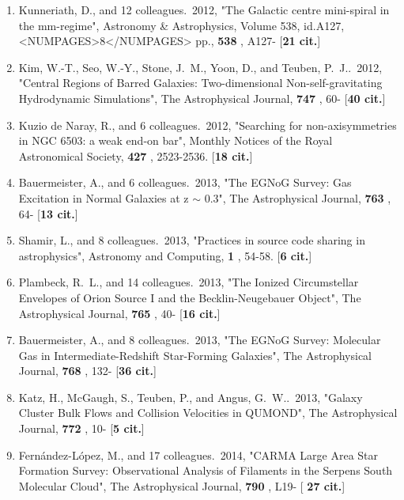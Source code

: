 \documentclass[11pt,letterpaper]{article}
\newcommand{\amp}{\&}
\newcommand{\ap}{$\sim$}
\begin{document}
\begin{enumerate}[resume,label=\textbf{\arabic*}.]
\item  
Kunneriath, D., and 12 colleagues.\  2012,  "The Galactic centre 
mini-spiral in the mm-regime", Astronomy {\amp} Astrophysics, Volume 538, 
id.A127, <NUMPAGES>8</NUMPAGES> pp.,  {\bf 538} , A127- [{\bf 21 cit.}] 

\item  
Kim, W.-T., Seo, W.-Y., Stone, J.~M., Yoon, D., and Teuben, P.~J..\  2012,  
"Central Regions of Barred Galaxies: Two-dimensional Non-self-gravitating 
Hydrodynamic Simulations", The Astrophysical Journal,  {\bf 747} , 60- 
[{\bf 40 cit.}] 

\item  
Kuzio de Naray, R., and 6 colleagues.\  2012,  "Searching for 
non-axisymmetries in NGC 6503: a weak end-on bar", Monthly Notices of the 
Royal Astronomical Society,  {\bf 427} , 2523-2536.  [{\bf 18 cit.}] 

\item  
Bauermeister, A., and 6 colleagues.\  2013,  "The EGNoG Survey: Gas 
Excitation in Normal Galaxies at z {\ap} 0.3", The Astrophysical Journal,  
{\bf 763} , 64- [{\bf 13 cit.}] 

\item  
Shamir, L., and 8 colleagues.\  2013,  "Practices in source code sharing in 
astrophysics", Astronomy and Computing,  {\bf 1} , 54-58.  [{\bf 6 cit.}] 

\item  
Plambeck, R.~L., and 14 colleagues.\  2013,  "The Ionized Circumstellar 
Envelopes of Orion Source I and the Becklin-Neugebauer Object", The 
Astrophysical Journal,  {\bf 765} , 40- [{\bf 16 cit.}] 

\item  
Bauermeister, A., and 8 colleagues.\  2013,  "The EGNoG Survey: Molecular 
Gas in Intermediate-Redshift Star-Forming Galaxies", The Astrophysical 
Journal,  {\bf 768} , 132- [{\bf 36 cit.}] 

\item  
Katz, H., McGaugh, S., Teuben, P., and Angus, G.~W..\  2013,  "Galaxy 
Cluster Bulk Flows and Collision Velocities in QUMOND", The Astrophysical 
Journal,  {\bf 772} , 10- [{\bf 5 cit.}] 

\item  
Fern{\'a}ndez-L{\'o}pez, M., and 17 colleagues.\  2014,  "CARMA Large Area 
Star Formation Survey: Observational Analysis of Filaments in the Serpens 
South Molecular Cloud", The Astrophysical Journal,  {\bf 790} , L19- [{\bf 
27 cit.}] 


\end{enumerate}
\end{document}
